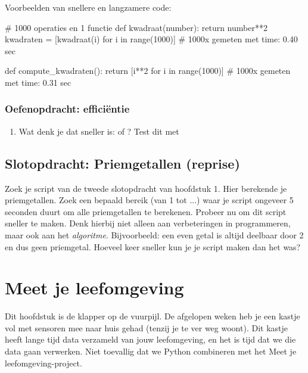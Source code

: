 \documentclass[a4paper,11pt, fleqn]{article}
\newcommand{\ditwc}{Naam van het huidige werkcollege}
\begin{document}
Voorbeelden van snellere en langzamere code:

\begin{python}
# 1000 operaties en 1 functie
def kwadraat(number):
    return number**2
kwadraten = [kwadraat(i) for i in range(1000)]
# 1000x gemeten met time: 0.40 sec

def compute_kwadraten():
    return [i**2 for i in range(1000)]
# 1000x gemeten met time: 0.31 sec
\end{python}

\subsubsection*{Oefenopdracht: effici\"entie}
\begin{enumerate}[label=(\alph*)]
\item Wat denk je dat sneller is:  of ? Test dit met 
\end{enumerate}


\subsection{Slotopdracht: Priemgetallen (reprise)}
Zoek je script van de tweede slotopdracht van hoofdstuk 1. Hier berekende je priemgetallen. Zoek een bepaald bereik (van 1 tot ...) waar je script ongeveer 5 seconden duurt om alle priemgetallen te berekenen. Probeer nu om dit script sneller te maken. Denk hierbij niet alleen aan verbeteringen in programmeren, maar ook aan het {\it algoritme}. Bijvoorbeeld: een even getal is altijd deelbaar door 2 en dus geen priemgetal. Hoeveel keer sneller kun je je script maken dan het was?

\clearpage
\renewcommand{\ditwc}{Meet je leefomgeving}
\section[Meet je leefomgeving]{\ditwc}
Dit hoofdstuk is de klapper op de vuurpijl. De afgelopen weken heb je een kastje vol met sensoren mee naar huis gehad (tenzij je te ver weg woont). Dit kastje heeft lange tijd data verzameld van jouw leefomgeving, en het is tijd dat we die data gaan verwerken. Niet toevallig dat we Python combineren met het Meet je leefomgeving-project. 
\end{document}

